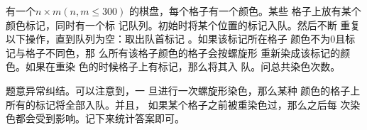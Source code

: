 \begin{prob}
	有一个$n \times m(n,m \le 300)$
	的棋盘，每个格子有一个颜色。某些
	格子上放有某个颜色标记，同时有一个标
	记队列。初始时将某个位置的标记入队。然后不断
	重复以下操作，直到队列为空：取出队首标记
	。如果该标记所在格子
	颜色不为0且标记与格子不同色，那
	么所有该格子颜色的格子会按螺旋形
	重新染成该标记的颜色。如果在重染
	色的时候格子上有标记，那么将其入
	队。问总共染色次数。
\end{prob}

\begin{sol}
	题意异常纠结。可以注意到，一
	旦进行一次螺旋形染色，那么某种
	颜色的格子上所有的标记将全部入队。并且，
	如果某个格子之前被重染色过，那么之后每
	次染色都会受到影响。记下来统计答案即可。
\end{sol}

